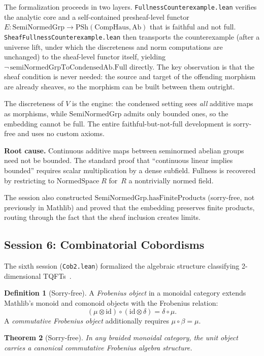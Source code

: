 \documentclass[11pt]{amsart}
\theoremstyle{plain}
\newtheorem{theorem}{Theorem}[section]
\theoremstyle{definition}
\newtheorem{definition}[theorem]{Definition}
\newcommand{\SemiNormedGrp}{\mathrm{SemiNormedGrp}}
\newcommand{\id}{\mathrm{id}}
\begin{document}
The formalization proceeds in two layers. \texttt{FullnessCounterexample.lean} verifies the analytic core and a self-contained presheaf-level functor $E : \SemiNormedGrp \to \mathrm{PSh}(\mathrm{CompHaus}, \mathrm{Ab})$ that is faithful and not full. \texttt{SheafFullnessCounterexample.lean} then transports the counterexample (after a universe lift, under which the discreteness and norm computations are unchanged) to the sheaf-level functor itself, yielding $\neg\,\mathrm{semiNormedGrpToCondensedAb}.\mathrm{Full}$ directly. The key observation is that the sheaf condition is never needed: the source and target of the offending morphism are already sheaves, so the morphism can be built between them outright.

The discreteness of $V$ is the engine: the condensed setting sees \emph{all} additive maps as morphisms, while $\SemiNormedGrp$ admits only bounded ones, so the embedding cannot be full. The entire faithful-but-not-full development is sorry-free and uses no custom axioms.

\textbf{Root cause.} Continuous additive maps between seminormed abelian groups need not be bounded. The standard proof that ``continuous linear implies bounded'' requires scalar multiplication by a dense subfield. Fullness is recovered by restricting to $\mathrm{NormedSpace}\;R$ for~$R$ a nontrivially normed field.

The session also constructed $\SemiNormedGrp.\mathrm{hasFiniteProducts}$ (sorry-free, not previously in Mathlib) and proved that the embedding preserves finite products, routing through the fact that the sheaf inclusion creates limits.

\subsection{Session 6: Combinatorial Cobordisms}

The sixth session (\texttt{Cob2.lean}) formalized the algebraic structure classifying 2-dimensional TQFTs~\cite{Kock2003}.

\begin{definition}[Sorry-free]
A \emph{Frobenius object} in a monoidal category extends Mathlib's monoid and comonoid objects with the Frobenius relation:
\[
(\mu \otimes \id) \circ (\id \otimes \delta) = \delta \circ \mu.
\]
A \emph{commutative Frobenius object} additionally requires $\mu \circ \beta = \mu$.
\end{definition}

\begin{theorem}[Sorry-free]
In any braided monoidal category, the unit object carries a canonical commutative Frobenius algebra structure.
\end{theorem}
\end{document}
